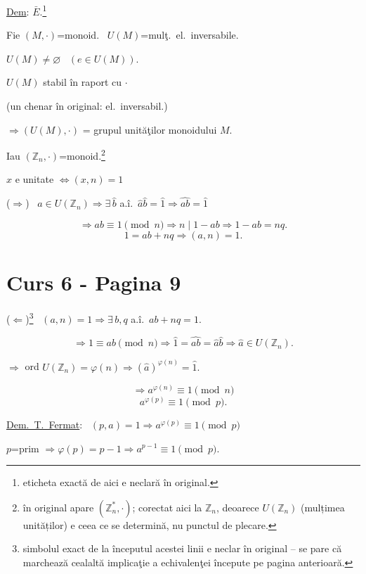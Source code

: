 \bigskip
\noindent\underline{Dem}: $\bar E$.\footnote{eticheta exactă de aici e neclară în original.}

\noindent Fie $(M,\cdot)$=monoid. \ $U(M)$=mulţ.\ el.\ inversabile.

\bigskip
\noindent $U(M)\neq\varnothing$ \ $(e\in U(M))$.

\noindent $U(M)$ stabil în raport cu $\cdot$

\noindent (un chenar în original: el.\ inversabil.)

\bigskip
\noindent $\Rightarrow (U(M),\cdot)$ = grupul unităţilor monoidului $M$.

\bigskip
\noindent Iau $(\mathbb{Z}_n,\cdot)$=monoid.\footnote{în original apare $(\mathbb{Z}_n^*,\cdot)$; corectat aici la $\mathbb{Z}_n$, deoarece $U(\mathbb{Z}_n)$ (mulțimea unităților) e ceea ce se determină, nu punctul de plecare.}

\bigskip
\noindent $\hat x$ e unitate $\Leftrightarrow (x,n)=1$

\bigskip
\noindent ($\Rightarrow$) \ $\hat a\in U(\mathbb{Z}_n) \Rightarrow \exists\,\hat b$ a.î.\ $\hat a\hat b=\hat 1 \Rightarrow \widehat{ab}=\hat 1$

\[
\Rightarrow ab\equiv 1 \pmod n \Rightarrow n\mid 1-ab \Rightarrow 1-ab=nq.
\]
\[
1=ab+nq \Rightarrow (a,n)=1.
\]




\section*{Curs 6 - Pagina 9}

\noindent ($\Leftarrow$)\footnote{simbolul exact de la începutul acestei linii e neclar în original -- se pare că marchează cealaltă implicaţie a echivalenţei începute pe pagina anterioară.} \ $(a,n)=1 \Rightarrow \exists\,b,q$ a.î.\ $ab+nq=1$.

\[
\Rightarrow 1\equiv ab \pmod n \Rightarrow \hat 1=\widehat{ab}=\hat a\hat b \Rightarrow \hat a\in U(\mathbb{Z}_n).
\]

\bigskip
\noindent $\Rightarrow$ ord $U(\mathbb{Z}_n) = \varphi(n) \Rightarrow (\hat a)^{\varphi(n)} = \hat 1.$

\[
\Rightarrow a^{\varphi(n)} \equiv 1 \pmod n
\]
\[
a^{\varphi(p)} \equiv 1 \pmod p.
\]

\bigskip
\noindent\underline{Dem.\ T.\ Fermat}: \ $(p,a)=1 \Rightarrow a^{\varphi(p)}\equiv 1 \pmod p$

\noindent $p$=prim $\Rightarrow \varphi(p)=p-1 \Rightarrow a^{p-1}\equiv 1 \pmod p$.

